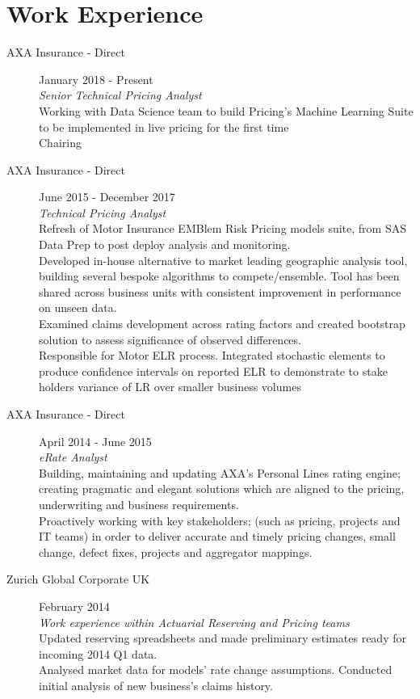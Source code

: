 \documentclass[10pt]{article}
\begin{document}
\section*{Work Experience}
\begin{description}

\item[AXA Insurance - Direct] January 2018 - Present\\
\emph{Senior Technical Pricing Analyst}\\
Working with Data Science team to build Pricing's Machine Learning Suite to be implemented in live pricing for the first time \\
Chairing


\item[AXA Insurance - Direct] June 2015 - December 2017\\
\emph{Technical Pricing Analyst}\\
Refresh of Motor Insurance EMBlem Risk Pricing models suite, from SAS Data Prep to post deploy analysis and monitoring. \\
Developed in-house alternative to market leading geographic analysis tool, building several bespoke algorithms to compete/ensemble. Tool has been shared across business units with consistent improvement in performance on unseen data. \\
Examined claims development across rating factors and created bootstrap solution to assess significance of observed differences. \\
Responsible for Motor ELR process. Integrated stochastic elements to produce confidence intervals on reported ELR to demonstrate to stake holders variance of LR over smaller business volumes 

\item[AXA Insurance - Direct] April 2014 - June 2015\\
\emph{eRate Analyst}\\
Building, maintaining and updating AXA's Personal Lines rating engine; creating pragmatic and elegant solutions which are aligned to the pricing, underwriting and business requirements.\\
Proactively working with key stakeholders; (such as pricing, projects and IT teams) in order to deliver accurate and timely pricing changes, small change, defect fixes, projects and aggregator mappings.

\item[Zurich Global Corporate UK] February 2014\\
\emph{Work experience within Actuarial Reserving and Pricing teams}\\
Updated reserving spreadsheets and made preliminary estimates ready for incoming 2014 Q1 data.\\
Analysed market data for models' rate change assumptions. Conducted initial analysis of new business's claims history.


\end{description}
\end{document}

